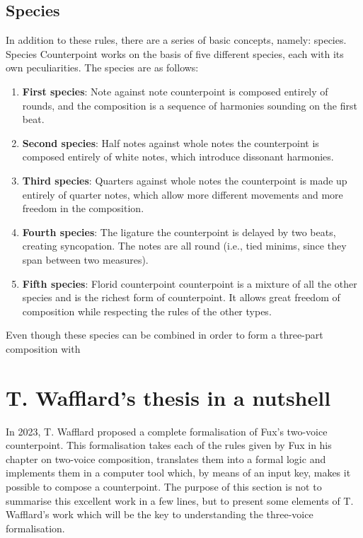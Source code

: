 \subsection{Species}
In addition to these rules, there are a series of basic concepts, namely: species. Species Counterpoint works on the basis of five different species, each with its own peculiarities. The species are as follows:
\begin{enumerate}
    \item \textbf{First species}: Note against note \textendash{} counterpoint is composed entirely of rounds, and the composition is a sequence of harmonies sounding on the first beat.
    \item \textbf{Second species}: Half notes against whole notes \textendash{} the counterpoint is composed entirely of white notes, which introduce dissonant harmonies.
    \item \textbf{Third species}: Quarters against whole notes \textendash{} the counterpoint is made up entirely of quarter notes, which allow more different movements and more freedom in the composition.
    \item \textbf{Fourth species}: The ligature \textendash{} the counterpoint is delayed by two beats, creating syncopation. The notes are all round (i.e., tied minims, since they span between two measures).
    \item \textbf{Fifth species}: Florid counterpoint \textendash{} counterpoint is a mixture of all the other species and is the richest form of counterpoint. It allows great freedom of composition while respecting the rules of the other types.
\end{enumerate}

Even though these species can be combined in order to form a three-part composition with 

\section{T. Wafflard's thesis in a nutshell}\label{section:thomas-in-a-nutshell}

In 2023, T. Wafflard proposed a complete formalisation of Fux's two-voice counterpoint. This formalisation takes each of the rules given by Fux in his chapter on two-voice composition, translates them into a formal logic and implements them in a computer tool which, by means of an input key, makes it possible to compose a counterpoint. The purpose of this section is not to summarise this excellent work in a few lines, but to present some elements of T. Wafflard's work which will be the key to understanding the three-voice formalisation.

